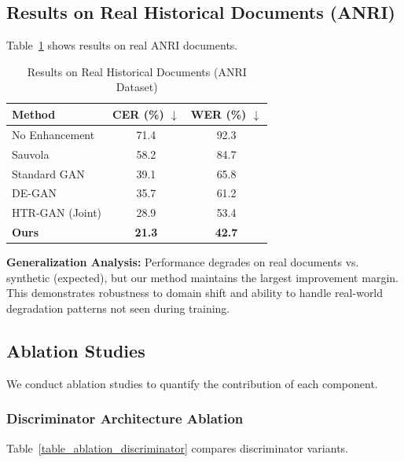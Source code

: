 \documentclass[journal]{IEEEtran}
\begin{document}
\subsection{Results on Real Historical Documents (ANRI)}

Table~\ref{table_anri_results} shows results on real ANRI documents.

\begin{table}[!t]
\renewcommand{\arraystretch}{1.3}
\caption{Results on Real Historical Documents (ANRI Dataset)}
\label{table_anri_results}
\centering
\begin{tabular}{|l|c|c|}
\hline
\textbf{Method} & \textbf{CER (\%) $\downarrow$} & \textbf{WER (\%) $\downarrow$} \\
\hline
No Enhancement & 71.4 & 92.3 \\
Sauvola & 58.2 & 84.7 \\
Standard GAN & 39.1 & 65.8 \\
DE-GAN & 35.7 & 61.2 \\
HTR-GAN (Joint) & 28.9 & 53.4 \\
\textbf{Ours} & \textbf{21.3} & \textbf{42.7} \\
\hline
\end{tabular}
\end{table}

\textbf{Generalization Analysis:}
Performance degrades on real documents vs. synthetic (expected), but our method maintains the largest improvement margin. This demonstrates robustness to domain shift and ability to handle real-world degradation patterns not seen during training.

\subsection{Ablation Studies}

We conduct ablation studies to quantify the contribution of each component.

\subsubsection{Discriminator Architecture Ablation}

Table~\ref{table_ablation_discriminator} compares discriminator variants.
\end{document}
